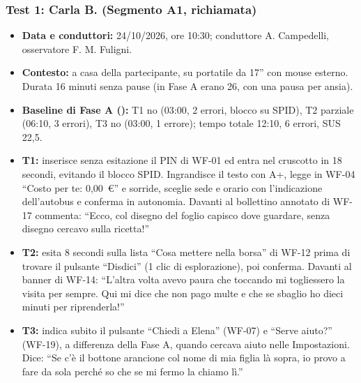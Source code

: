 \subsubsection{Test 1: Carla B. (Segmento A1, richiamata)}

\begin{itemize}
\item \textbf{Data e conduttori:} 24/10/2026, ore 10:30; conduttore A. Campedelli, osservatore F. M. Fuligni.
\item \textbf{Contesto:} a casa della partecipante, su portatile da 17'' con mouse esterno. Durata 16 minuti senza pause (in Fase A erano 26, con una pausa per ansia).
\item \textbf{Baseline di Fase A ():} T1 no (03:00, 2 errori, blocco su SPID), T2 parziale (06:10, 3 errori), T3 no (03:00, 1 errore); tempo totale 12:10, 6 errori, SUS 22,5.
\end{itemize}


\begin{itemize}
\item \textbf{T1:} inserisce senza esitazione il PIN di WF-01 ed entra nel cruscotto in 18 secondi, evitando il blocco SPID. Ingrandisce il testo con A+, legge in WF-04 ``Costo per te: 0,00~€'' e sorride, sceglie sede e orario con l'indicazione dell'autobus e conferma in autonomia. Davanti al bollettino annotato di WF-17 commenta: \enquote{Ecco, col disegno del foglio capisco dove guardare, senza disegno cercavo sulla ricetta!}
\item \textbf{T2:} esita 8 secondi sulla lista ``Cosa mettere nella borsa'' di WF-12 prima di trovare il pulsante ``Disdici'' (1 clic di esplorazione), poi conferma. Davanti al banner di WF-14: \enquote{L'altra volta avevo paura che toccando mi togliessero la visita per sempre. Qui mi dice che non pago multe e che se sbaglio ho dieci minuti per riprenderla!}
\item \textbf{T3:} indica subito il pulsante ``Chiedi a Elena'' (WF-07) e ``Serve aiuto?'' (WF-19), a differenza della Fase A, quando cercava aiuto nelle Impostazioni. Dice: \enquote{Se c'è il bottone arancione col nome di mia figlia là sopra, io provo a fare da sola perché so che se mi fermo la chiamo lì.}
\end{itemize}

